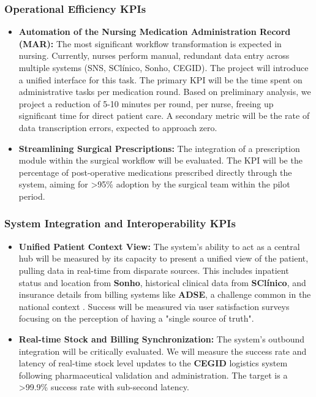 \subsubsection{Operational Efficiency KPIs}
\begin{itemize}
    \item \textbf{Automation of the Nursing Medication Administration Record (MAR):} The most significant workflow transformation is expected in nursing. Currently, nurses perform manual, redundant data entry across multiple systems (SNS, SClínico, Sonho, CEGID). The project will introduce a unified interface for this task. The primary KPI will be the time spent on administrative tasks per medication round. Based on preliminary analysis, we project a reduction of 5-10 minutes per round, per nurse, freeing up significant time for direct patient care. A secondary metric will be the rate of data transcription errors, expected to approach zero.
    \item \textbf{Streamlining Surgical Prescriptions:} The integration of a prescription module within the surgical workflow will be evaluated. The KPI will be the percentage of post-operative medications prescribed directly through the system, aiming for >95\% adoption by the surgical team within the pilot period.
\end{itemize}

\subsubsection{System Integration and Interoperability KPIs}
\begin{itemize}
    \item \textbf{Unified Patient Context View:} The system's ability to act as a central hub will be measured by its capacity to present a unified view of the patient, pulling data in real-time from disparate sources. This includes inpatient status and location from \textbf{Sonho}, historical clinical data from \textbf{SClínico}, and insurance details from billing systems like \textbf{ADSE}, a challenge common in the national context \cite{pinto2016identification}. Success will be measured via user satisfaction surveys focusing on the perception of having a "single source of truth".
    \item \textbf{Real-time Stock and Billing Synchronization:} The system's outbound integration will be critically evaluated. We will measure the success rate and latency of real-time stock level updates to the \textbf{CEGID} logistics system following pharmaceutical validation and administration. The target is a >99.9\% success rate with sub-second latency.
\end{itemize} 